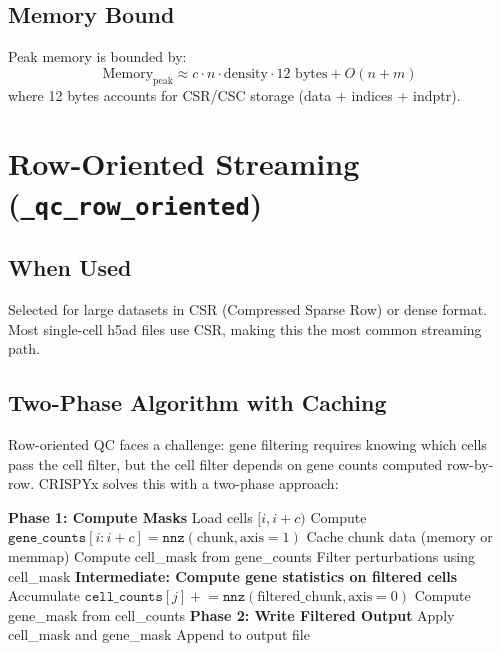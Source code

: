 \documentclass{article}
\begin{document}
\subsection{Memory Bound}
Peak memory is bounded by:
\begin{equation}
\text{Memory}_{\text{peak}} \approx c \cdot n \cdot \text{density} \cdot 12 \text{ bytes} + O(n + m)
\end{equation}
where 12 bytes accounts for CSR/CSC storage (data + indices + indptr).

\section{Row-Oriented Streaming (\texttt{\_qc\_row\_oriented})}

\subsection{When Used}
Selected for large datasets in CSR (Compressed Sparse Row) or dense format. Most 
single-cell h5ad files use CSR, making this the most common streaming path.

\subsection{Two-Phase Algorithm with Caching}

Row-oriented QC faces a challenge: gene filtering requires knowing which cells pass 
the cell filter, but the cell filter depends on gene counts computed row-by-row. 
CRISPYx solves this with a two-phase approach:

\begin{algorithm}[H]
\caption{Row-Oriented Streaming QC with Cache}
\begin{algorithmic}[1]
\State \textbf{Phase 1: Compute Masks}
    \State Load cells $[i, i+c)$
    \State Compute $\texttt{gene\_counts}[i:i+c] = \texttt{nnz}(\text{chunk}, \text{axis}=1)$
    \State Cache chunk data (memory or memmap)
\EndFor
\State Compute cell\_mask from gene\_counts
\State Filter perturbations using cell\_mask
\State
\State \textbf{Intermediate: Compute gene statistics on filtered cells}
    \State Accumulate $\texttt{cell\_counts}[j] \mathrel{+}= \texttt{nnz}(\text{filtered\_chunk}, \text{axis}=0)$
\EndFor
\State Compute gene\_mask from cell\_counts
\State
\State \textbf{Phase 2: Write Filtered Output}
    \State Apply cell\_mask and gene\_mask
    \State Append to output file
\EndFor
\end{algorithmic}
\end{algorithm}
\end{document}
